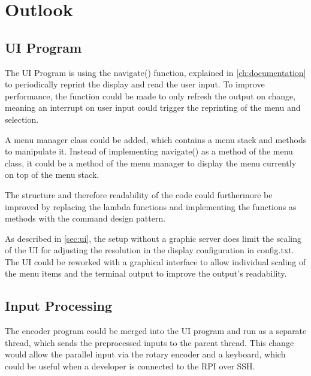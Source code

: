 \chapter{Outlook}\label{ch:outlook}
\section{UI Program}
The UI Program is using the navigate() function, explained in \cref{ch:documentation} to periodically reprint the display and read the user input.
To improve performance, the function could be made to only refresh the output on change, meaning an interrupt on user input could trigger the reprinting of the menu and selection.

A menu manager class could be added, which contains a menu stack and methods to manipulate it.
Instead of implementing navigate() as a method of the menu class, it could be a method of the menu manager to display the menu currently on top of the menu stack.

The structure and therefore readability of the code could furthermore be improved by replacing the lambda functions and implementing the functions as methods with the command design pattern.

As described in \cref{sec:ui}, the setup without a graphic server does limit the scaling of the UI for adjusting the resolution in the display configuration in config.txt.
The UI could be reworked with a graphical interface to allow individual scaling of the menu items and the terminal output to improve the output's readability.

\section{Input Processing}
The encoder program could be merged into the UI program and run as a separate thread, which sends the preprocessed inputs to the parent thread.
This change would allow the parallel input via the rotary encoder and a keyboard, which could be useful when a developer is connected to the RPI over SSH.

